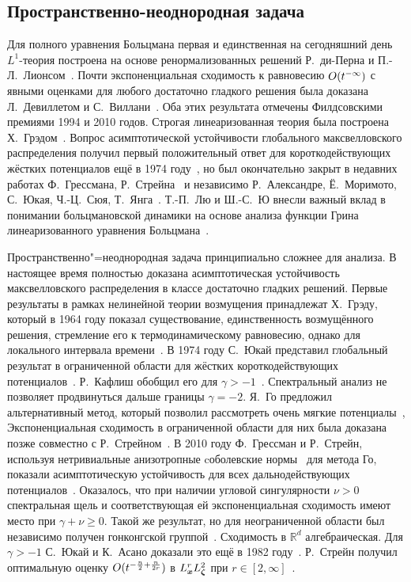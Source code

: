 \subsection{Пространственно-неоднородная задача}

Для полного уравнения Больцмана первая и единственная на сегодняшний день \(L^1\)-теория
построена на основе ренормализованных решений Р.~ди-Перна и П.-Л.~Лионсом~\autocite{Lions1989}.
Почти экспоненциальная сходимость к равновесию \(O(t^{-\infty})\) с явными оценками
для любого достаточно гладкого решения была доказана Л.~Девиллетом и С.~Виллани~\autocite{Villani2005}.
Оба этих результата отмечены Филдсовскими премиями 1994 и 2010 годов.
Строгая линеаризованная теория была построена Х.~Грэдом~\autocite{Grad1963b}.
Вопрос асимптотической устойчивости глобального максвелловского распределения
получил первый положительный ответ для короткодействующих жёстких потенциалов ещё в 1974 году~\autocite{Ukai1974},
но был окончательно закрыт в недавних работах Ф.~Грессмана, Р.~Стрейна~\autocite{Strain2011} и независимо
Р.~Александре, Ё.~Моримото, С.~Юкая, Ч.-Ц.~Сюя, Т.~Янга~\autocite{Alexandre2012soft}.
Т.-П.~Лю и Ш.-С.~Ю внесли важный вклад в понимании больцмановской динамики
на основе анализа функции Грина линеаризованного уравнения Больцмана~\autocite{Liu2004green, Liu2006}.

Пространственно"=неоднородная задача принципиально сложнее для анализа.
В настоящее время полностью доказана асимптотическая устойчивость максвелловского распределения
в классе достаточно гладких решений.
Первые результаты в рамках нелинейной теории возмущения принадлежат Х.~Грэду, который в 1964 году показал
существование, единственность возмущённого решения, стремление его к термодинамическому равновесию,
однако для локального интервала времени~\cite{Grad1965}.
В 1974 году С.~Юкай представил глобальный результат в ограниченной области
для жёстких короткодействующих потенциалов~\cite{Ukai1974}.
Р.~Кафлиш обобщил его для \(\gamma>-1\)~\cite{Caflisch1980b}.
Спектральный анализ не позволяет продвинуться дальше границы \(\gamma=-2\).
Я.~Го предложил альтернативный метод, который позволил рассмотреть очень мягкие потенциалы~\cite{Guo2003},
Экспоненциальная сходимость в ограниченной области для них была доказана позже совместно с Р.~Стрейном~\cite{Strain2008}.
В 2010 году Ф.~Грессман и Р.~Стрейн, используя нетривиальные анизотропные cоболевские нормы~\cite{Mouhot2007} для метода Го,
показали асимптотическую устойчивость для всех дальнодействующих потенциалов~\cite{Strain2011}.
Оказалось, что при наличии угловой сингулярности \(\nu>0\) спектральная щель и
соответствующая ей экспоненциальная сходимость имеют место при \(\gamma+\nu\geq0\).
Такой же результат, но для неограниченной области был независимо получен
гонконгской группой~\cite{Alexandre2012soft, Alexandre2011hard, Alexandre2011properties}.
Сходимость в \(\mathbb{R}^d\) алгебраическая. Для \(\gamma>-1\) С.~Юкай и К.~Асано доказали это ещё в 1982 году~\cite{Ukai1982}.
Р.~Стрейн получил оптимальную оценку \(O(t^{-\frac{n}2+\frac{n}{2r}})\) в \(L^r_{\boldsymbol{x}} L^2_{\boldsymbol{\zeta}}\) при \(r\in[2,\infty]\)~\cite{Strain2012}.


